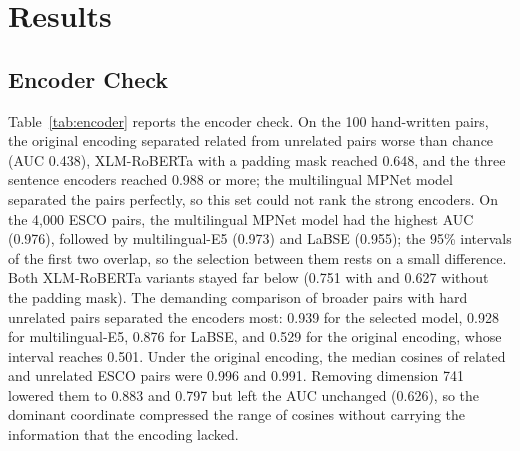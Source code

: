 \documentclass[CHICAGO]{USG}
\begin{document}
\section{Results}
\label{sec:results}

\subsection{Encoder Check}
\label{sec:res-encoder}
Table~\ref{tab:encoder} reports the encoder check. On the 100 hand-written pairs, the original encoding separated related from unrelated pairs worse than chance (AUC 0.438), XLM-RoBERTa with a padding mask reached 0.648, and the three sentence encoders reached 0.988 or more; the multilingual MPNet model separated the pairs perfectly, so this set could not rank the strong encoders. %
On the 4{,}000 ESCO pairs, the multilingual MPNet model had the highest AUC (0.976), followed by multilingual-E5 (0.973) and LaBSE (0.955); the 95\% intervals of the first two overlap, so the selection between them rests on a small difference. %
Both XLM-RoBERTa variants stayed far below (0.751 with and 0.627 without the padding mask). %
The demanding comparison of broader pairs with hard unrelated pairs separated the encoders most: 0.939 for the selected model, 0.928 for multilingual-E5, 0.876 for LaBSE, and 0.529 for the original encoding, whose interval reaches 0.501. %
Under the original encoding, the median cosines of related and unrelated ESCO pairs were 0.996 and 0.991. Removing dimension 741 lowered them to 0.883 and 0.797 but left the AUC unchanged (0.626), so the dominant coordinate compressed the range of cosines without carrying the information that the encoding lacked. %
\end{document}
